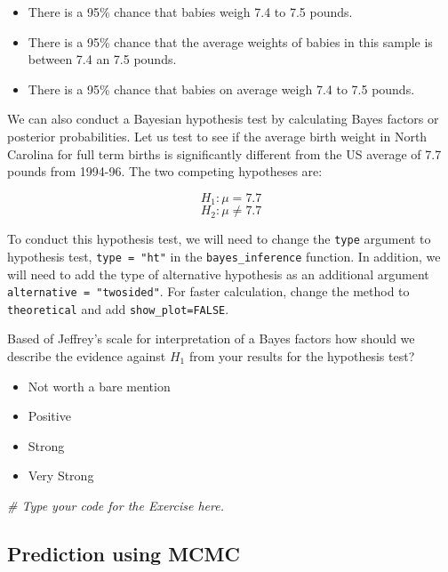 \documentclass[]{article}
\newenvironment{Shaded}{\begin{snugshade}}{\end{snugshade}}
\newcommand{\CommentTok}[1]{\textcolor[rgb]{0.56,0.35,0.01}{\textit{#1}}}
\providecommand{\tightlist}{%
  \setlength{\itemsep}{0pt}\setlength{\parskip}{0pt}}
\begin{document}
\begin{itemize}
\tightlist
\item
  There is a 95\% chance that babies weigh 7.4 to 7.5 pounds.
\item
  There is a 95\% chance that the average weights of babies in this
  sample is between 7.4 an 7.5 pounds.
\item
  There is a 95\% chance that babies on average weigh 7.4 to 7.5 pounds.
\end{itemize}

We can also conduct a Bayesian hypothesis test by calculating Bayes
factors or posterior probabilities. Let us test to see if the average
birth weight in North Carolina for full term births is significantly
different from the US average of 7.7 pounds from 1994-96. The two
competing hypotheses are:

\[ H_1: \mu = 7.7 \] \[ H_2: \mu \ne 7.7 \]

To conduct this hypothesis test, we will need to change the
\texttt{type} argument to hypothesis test, \texttt{type\ =\ "ht"} in the
\texttt{bayes\_inference} function. In addition, we will need to add the
type of alternative hypothesis as an additional argument
\texttt{alternative\ =\ "twosided"}. For faster calculation, change the
method to \texttt{theoretical} and add \texttt{show\_plot=FALSE}.

Based of Jeffrey's scale for interpretation of a Bayes factors how
should we describe the evidence against \(H_1\) from your results for
the hypothesis test?

\begin{itemize}
\tightlist
\item
  Not worth a bare mention
\item
  Positive
\item
  Strong
\item
  Very Strong
\end{itemize}

\begin{Shaded}
\begin{Highlighting}[]
\CommentTok{# Type your code for the Exercise here.}
\end{Highlighting}
\end{Shaded}

\subsection{Prediction using MCMC}\label{prediction-using-mcmc}
\end{document}
